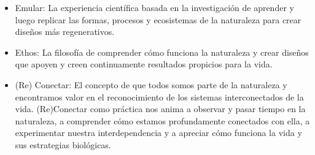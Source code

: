 \documentclass[twocolumn,amsmath,amssymb,aps,floatfix]{revtex4-2}
\begin{document}
\begin{itemize}
   \item Emular: La experiencia científica basada en la investigación de aprender
   y luego replicar las formas, procesos y ecosistemas de la naturaleza para crear
   diseños más regenerativos.
   \item Ethos: La filosofía de comprender cómo funciona la naturaleza y crear
   diseños que apoyen y creen continuamente resultados propicios para la vida.
   \item (Re) Conectar: El concepto de que todos somos parte de la naturaleza y
   encontramos valor en el reconocimiento de los sistemas interconectados de la
   vida. (Re)Conectar como práctica nos anima a observar y pasar tiempo en la
   naturaleza, a comprender cómo estamos profundamente conectados con ella, a
   experimentar nuestra interdependencia y a apreciar cómo funciona la vida y
   sus estrategias biológicas.
\end{itemize}



\end{document}
